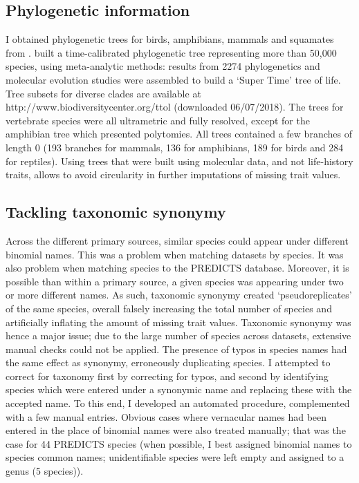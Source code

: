 \subsection{Phylogenetic information}
I obtained phylogenetic trees for birds, amphibians, mammals and squamates from \citet{Hedges2015}. \citet{Hedges2015} built a time-calibrated phylogenetic tree representing more than 50,000 species, using meta-analytic methods: results from 2274 phylogenetics and molecular evolution studies were assembled to build a `Super Time' tree of life. Tree subsets for diverse clades are available at http://www.biodiversitycenter.org/ttol (downloaded 06/07/2018). The trees for vertebrate species were all ultrametric and fully resolved, except for the amphibian tree which presented polytomies. All trees contained a few branches of length 0 (193 branches for mammals, 136 for amphibians, 189 for birds and 284 for reptiles). Using trees that were built using molecular data, and not life-history traits, allows to avoid circularity in further imputations of missing trait values.


\subsection{Tackling taxonomic synonymy}
Across the different primary sources, similar species could appear under different binomial names. This was a problem when matching datasets by species. It was also problem when matching species to the PREDICTS database. Moreover, it is possible than within a primary source, a given species was appearing under two or more different names. As such, taxonomic synonymy created `pseudoreplicates' of the same species, overall falsely increasing the total number of species and artificially inflating the amount of missing trait values. Taxonomic synonymy was hence a major issue; due to the large number of species across datasets, extensive manual checks could not be applied. The presence of typos in species names had the same effect as synonymy, erroneously duplicating species. I attempted to correct for taxonomy first by correcting for typos, and second by identifying species which were entered under a synonymic name and replacing these with the accepted name. To this end, I developed an automated procedure, complemented with a few manual entries. Obvious cases where vernacular names had been entered in the place of binomial names were also treated manually; that was the case for 44 PREDICTS species (when possible, I best assigned binomial names to species common names; unidentifiable species were left empty and assigned to a genus (5 species)).

